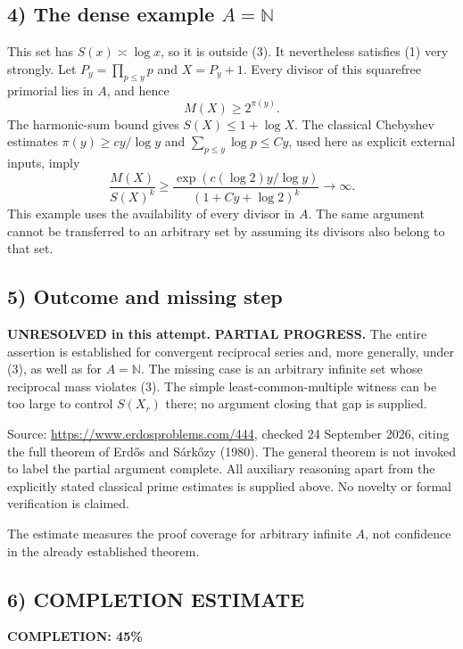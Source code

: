 \subsection*{4) The dense example $A=\mathbb N$}
This set has $S(x)\asymp\log x$, so it is outside (3). It nevertheless satisfies (1) very strongly. Let $P_y=\prod_{p\le y}p$ and $X=P_y+1$. Every divisor of this squarefree primorial lies in $A$, and hence
\[M(X)\ge2^{\pi(y)}.\]
The harmonic-sum bound gives $S(X)\le1+\log X$. The classical Chebyshev estimates $\pi(y)\ge c y/\log y$ and $\sum_{p\le y}\log p\le C y$, used here as explicit external inputs, imply
\[\frac{M(X)}{S(X)^k}
\ge\frac{\exp(c(\log2)y/\log y)}{(1+Cy+\log2)^k}
\longrightarrow\infty.\]
This example uses the availability of every divisor in $A$. The same argument cannot be transferred to an arbitrary set by assuming its divisors also belong to that set.

\subsection*{5) Outcome and missing step}
\textbf{UNRESOLVED in this attempt.} \textbf{PARTIAL PROGRESS.} The entire assertion is established for convergent reciprocal series and, more generally, under (3), as well as for $A=\mathbb N$. The missing case is an arbitrary infinite set whose reciprocal mass violates (3). The simple least-common-multiple witness can be too large to control $S(X_r)$ there; no argument closing that gap is supplied.

Source: \url{https://www.erdosproblems.com/444}, checked 24 September 2026, citing the full theorem of Erd\H{o}s and S\'ark\H{o}zy (1980). The general theorem is not invoked to label the partial argument complete. All auxiliary reasoning apart from the explicitly stated classical prime estimates is supplied above. No novelty or formal verification is claimed.

The estimate measures the proof coverage for arbitrary infinite $A$, not confidence in the already established theorem.
\subsection*{6) COMPLETION ESTIMATE}
\textbf{COMPLETION: 45\%}
